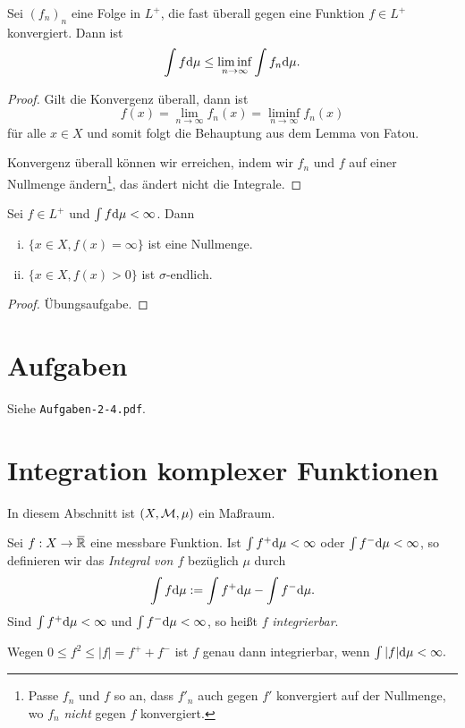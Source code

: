 \begin{folg}
 Sei $(f_n)_n$ eine Folge in $L^+$, die fast überall gegen eine Funktion $f \in L^+$ konvergiert. Dann ist
 \[ \int f \mathrm{d} \mu \le \liminf_{n \to \infty} \int f_n \mathrm{d} \mu. \]
\end{folg}

\begin{proof}
 Gilt die Konvergenz überall, dann ist
 \[ f(x) = \lim_{n \to \infty} f_n(x) = \liminf_{n \to \infty} f_n(x) \]
 für alle $x \in X$ und somit folgt die Behauptung aus dem Lemma von Fatou. 
 
 Konvergenz überall können wir erreichen, indem wir $f_n$ und $f$ auf einer Nullmenge ändern\footnote{Passe $f_n$ und $f$ so an, dass $f'_n$ auch gegen $f'$ konvergiert auf der Nullmenge, wo $f_n$ \emph{nicht} gegen $f$ konvergiert.}, das ändert nicht die Integrale.
\end{proof}

\begin{lem}
 Sei $f \in L^+$ und $\int f \mathrm{d} \mu < \infty$. Dann
 \begin{enumerate}[(i)]
  \item $\{ x \in X,  f(x) = \infty \}$ ist eine Nullmenge.
  \item $\{ x \in X, f(x) > 0 \}$ ist $\sigma$-endlich.
 \end{enumerate}
\end{lem}

\begin{proof}
 Übungsaufgabe.
\end{proof}

\section{Aufgaben}
Siehe \verb+Aufgaben-2-4.pdf+.

\section{Integration komplexer Funktionen}
In diesem Abschnitt ist $(X, \mathcal{M}, \mu)$ ein Maßraum.

\begin{defn}
 Sei $f:X \to \realext$ eine messbare Funktion. Ist $\int f^+ \mathrm{d} \mu < \infty$ oder $\int f^- \mathrm{d} \mu < \infty$, so definieren wir das \emph{Integral von $f$} bezüglich $\mu$ durch
 \[ \int f \mathrm{d} \mu := \int f^+ \mathrm{d} \mu - \int f^- \mathrm{d} \mu. \]
 Sind $\int f^+ \mathrm{d} \mu < \infty$ und $\int f^- \mathrm{d} \mu < \infty$, so heißt $f$ \emph{integrierbar}. 
 
 Wegen $0 \le f^2 \le |f| = f^+ + f^-$ ist $f$ genau dann integrierbar, wenn $\int |f| \mathrm{d} \mu < \infty.$
\end{defn}


